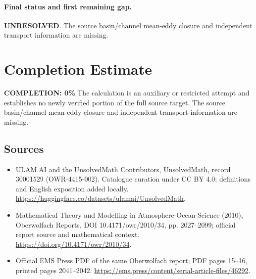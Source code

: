 \documentclass[11pt]{article}
\begin{document}
\paragraph{Final status and first remaining gap.}
\textbf{UNRESOLVED}. The source basin/channel mean-eddy closure and independent transport information are missing.

\section{Completion Estimate}
\noindent\textbf{COMPLETION: 0\%}
The calculation is an auxiliary or restricted attempt and establishes no newly verified portion of the full source target. The source basin/channel mean-eddy closure and independent transport information are missing.

\subsection{Sources}
\begin{itemize}
\item[\hypertarget{source:30001529:1}{S1}] ULAM.AI and the UnsolvedMath Contributors, UnsolvedMath, record 30001529 (OWR-4415-002). Catalogue curation under CC BY 4.0; definitions and English exposition added locally.
\url{https://huggingface.co/datasets/ulamai/UnsolvedMath}.
\item[\hypertarget{source:30001529:2}{S2}] Mathematical Theory and Modelling in Atmosphere-Ocean-Science (2010), Oberwolfach Reports, DOI 10.4171/owr/2010/34, pp. 2027--2099; official report source and mathematical context.
\url{https://doi.org/10.4171/owr/2010/34}.
\item[\hypertarget{source:30001529:3}{S3}] Official EMS Press PDF of the same Oberwolfach report; PDF pages 15--16, printed pages 2041--2042.
\url{https://ems.press/content/serial-article-files/46292}.
\end{itemize}
\label{end:30001529}
\end{document}
